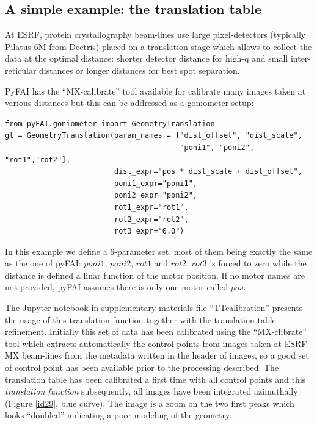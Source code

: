\documentclass[preprint]{iucr}              %
\begin{document}
\subsection{A simple example: the translation table}

At ESRF, protein crystallography beam-lines use large pixel-detectors (typically
Pilatus 6M from Dectris) placed on a translation stage which allows to collect
the data at the optimal distance: shorter detector distance for high-q and small
inter-reticular distances or longer distances for best spot separation.

PyFAI has the ``MX-calibrate'' tool available for calibrate many images taken at
various distances but this can be addressed as a goniometer setup: 

\begin{verbatim}
from pyFAI.goniometer import GeometryTranslation
gt = GeometryTranslation(param_names = ["dist_offset", "dist_scale", 
                                        "poni1", "poni2", "rot1","rot2"],
                         dist_expr="pos * dist_scale + dist_offset", 
                         poni1_expr="poni1",
                         poni2_expr="poni2", 
                         rot1_expr="rot1", 
                         rot2_expr="rot2", 
                         rot3_expr="0.0")
\end{verbatim}
 
In this example we define a 6-parameter set, most of them being exactly the same
as the one of pyFAI: $poni1$, $poni2$, $rot1$ and $rot2$. $rot3$ is forced to
zero while the distance is defined a linar function of the motor position.
If no motor names are not provided, pyFAI assumes there is only one motor
called $pos$.

The Jupyter notebook \cite{ipython} in supplementary materials file
``TTcalibration'' presents the usage of this translation function together with
the translation table refinement. 
Initially this set of data has been calibrated using the ``MX-clibrate'' tool
which extracts automatically the control points from images taken at ESRF-MX
beam-lines from the metadata written in the header of images, so a good set
of control point has been available prior to the processing described. 
The translation table has been calibrated a first time with all control points
and this \textit{translation function} subsequently, all images have been
integrated azimuthally (Figure \ref{id29}, blue curve). 
The image is a zoom on the two first peaks which looks ``doubled'' indicating a
poor modeling of the geometry.
\end{document}
